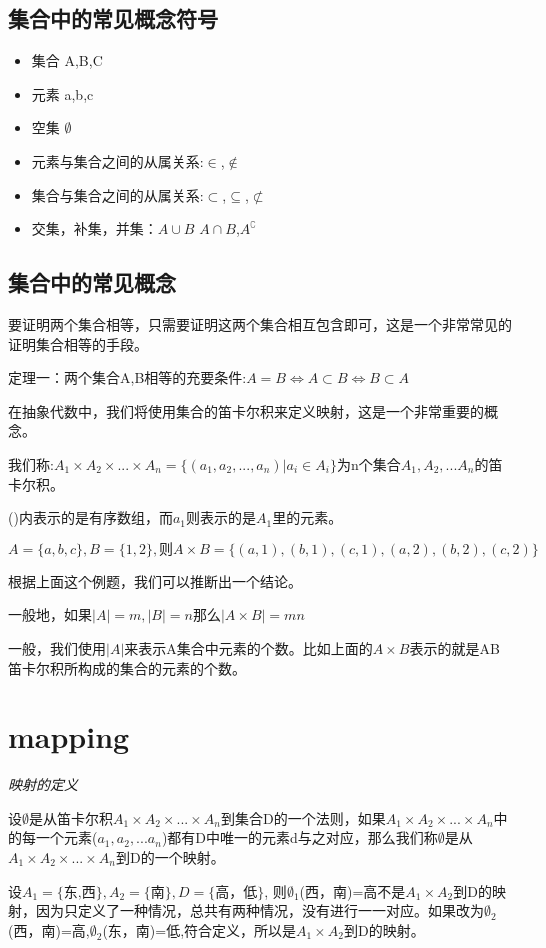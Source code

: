 \documentclass[
	11pt, %
	fleqn, %
	a4paper, %
]{LegrandOrangeBook}
\begin{document}
\subsection{集合中的常见概念符号}
\begin{itemize}
	\item 集合 A,B,C
	\item 元素 a,b,c
	\item 空集 $\emptyset$
	\item 元素与集合之间的从属关系:$\in$,$\notin$
	\item 集合与集合之间的从属关系:$\subset$,$\subseteq$,$\not\subset$
	\item 交集，补集，并集：$A\cup B$ $A\cap B$,$A^\complement$
\end{itemize}

\subsection{集合中的常见概念}
要证明两个集合相等，只需要证明这两个集合相互包含即可，这是一个非常常见的证明集合相等的手段。
\begin{theorem}
	定理一：两个集合A,B相等的充要条件:$A=B\Longleftrightarrow A\subset B\Longleftrightarrow B\subset A$
\end{theorem}
在抽象代数中，我们将使用集合的笛卡尔积来定义映射，这是一个非常重要的概念。
\begin{theorem}
	我们称:$A_1\times A_2\times ...\times A_n=\{(a_1,a_2,...,a_n)|a_i\in A_i\}$为n个集合$A_1,A_2,...A_n$的笛卡尔积。
\end{theorem}
()内表示的是有序数组，而$a_1$则表示的是$A_1$里的元素。
\begin{example}
	$$
		A=\{a,b,c\},B=\{1,2\},则
		A\times B =\{(a,1),(b,1),(c,1),(a,2),(b,2),(c,2)\}
	$$
\end{example}
根据上面这个例题，我们可以推断出一个结论。
\begin{theorem}
	一般地，如果$|A|=m,|B|=n$那么$|A\times B|=mn$
\end{theorem}
\begin{remark}
	一般，我们使用$|A|$来表示A集合中元素的个数。比如上面的$A\times B$表示的就是AB笛卡尔积所构成的集合的元素的个数。
\end{remark}

\section{mapping}
\begin{theorem}{\emph{映射的定义}}

	设$\emptyset$是从笛卡尔积$A_1\times A_2 \times ...\times A_n$到集合D的一个法则，如果$A_1\times A_2 \times ...\times A_n$中的每一个元素($a_1,a_2,...a_n$)都有D中唯一的元素d与之对应，那么我们称$\emptyset$是从$A_1\times A_2 \times ...\times A_n$到D的一个映射。
\end{theorem}
\begin{example}
	设$A_1=\{\mbox{东,西}\},A_2=\{\mbox{南}\},D=\{\mbox{高，低}\}$,
	则$\emptyset_1$(西，南)=高不是$A_1\times A_2$到D的映射，因为只定义了一种情况，总共有两种情况，没有进行一一对应。如果改为$\emptyset_2$(西，南)=高,$\emptyset_2$(东，南)=低,符合定义，所以是$A_1\times A_2$到D的映射。
\end{example}
\end{document}
